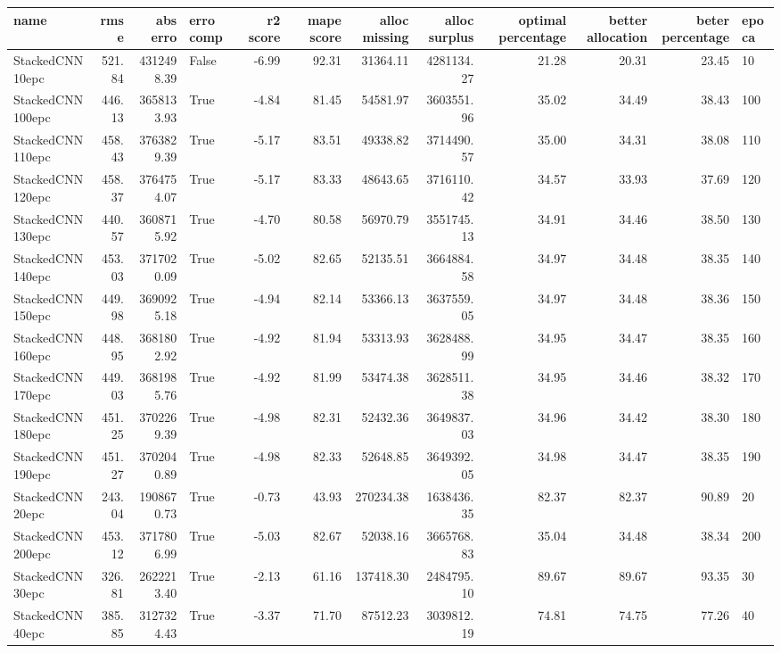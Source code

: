 \begin{tabular}{lrrlrrrrrrrl}
\toprule
name & rmse & abs erro & erro comp & r2 score & mape score & alloc missing & alloc surplus & optimal percentage & better allocation & beter percentage & epoca \\
\midrule
StackedCNN10epc & 521.84 & 4312498.39 & False & -6.99 & 92.31 & 31364.11 & 4281134.27 & 21.28 & 20.31 & 23.45 & 10 \\
StackedCNN100epc & 446.13 & 3658133.93 & True & -4.84 & 81.45 & 54581.97 & 3603551.96 & 35.02 & 34.49 & 38.43 & 100 \\
StackedCNN110epc & 458.43 & 3763829.39 & True & -5.17 & 83.51 & 49338.82 & 3714490.57 & 35.00 & 34.31 & 38.08 & 110 \\
StackedCNN120epc & 458.37 & 3764754.07 & True & -5.17 & 83.33 & 48643.65 & 3716110.42 & 34.57 & 33.93 & 37.69 & 120 \\
StackedCNN130epc & 440.57 & 3608715.92 & True & -4.70 & 80.58 & 56970.79 & 3551745.13 & 34.91 & 34.46 & 38.50 & 130 \\
StackedCNN140epc & 453.03 & 3717020.09 & True & -5.02 & 82.65 & 52135.51 & 3664884.58 & 34.97 & 34.48 & 38.35 & 140 \\
StackedCNN150epc & 449.98 & 3690925.18 & True & -4.94 & 82.14 & 53366.13 & 3637559.05 & 34.97 & 34.48 & 38.36 & 150 \\
StackedCNN160epc & 448.95 & 3681802.92 & True & -4.92 & 81.94 & 53313.93 & 3628488.99 & 34.95 & 34.47 & 38.35 & 160 \\
StackedCNN170epc & 449.03 & 3681985.76 & True & -4.92 & 81.99 & 53474.38 & 3628511.38 & 34.95 & 34.46 & 38.32 & 170 \\
StackedCNN180epc & 451.25 & 3702269.39 & True & -4.98 & 82.31 & 52432.36 & 3649837.03 & 34.96 & 34.42 & 38.30 & 180 \\
StackedCNN190epc & 451.27 & 3702040.89 & True & -4.98 & 82.33 & 52648.85 & 3649392.05 & 34.98 & 34.47 & 38.35 & 190 \\
StackedCNN20epc & 243.04 & 1908670.73 & True & -0.73 & 43.93 & 270234.38 & 1638436.35 & 82.37 & 82.37 & 90.89 & 20 \\
StackedCNN200epc & 453.12 & 3717806.99 & True & -5.03 & 82.67 & 52038.16 & 3665768.83 & 35.04 & 34.48 & 38.34 & 200 \\
StackedCNN30epc & 326.81 & 2622213.40 & True & -2.13 & 61.16 & 137418.30 & 2484795.10 & 89.67 & 89.67 & 93.35 & 30 \\
StackedCNN40epc & 385.85 & 3127324.43 & True & -3.37 & 71.70 & 87512.23 & 3039812.19 & 74.81 & 74.75 & 77.26 & 40 \\

\end{tabular}
